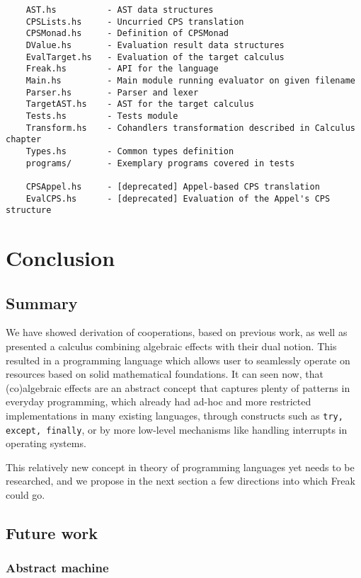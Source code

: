 \documentclass[declaration,shortabstract]{iithesis}
\theoremstyle{definition} \newtheorem{definition}{Definition}[chapter]
\theoremstyle{remark} \newtheorem{remark}[definition]{Observation}
\theoremstyle{plain} \newtheorem{theorem}[definition]{Theorem}
\theoremstyle{plain} \newtheorem{lemma}[definition]{Lemma}
\begin{document}
\begin{verbatim}
    AST.hs          - AST data structures
    CPSLists.hs     - Uncurried CPS translation
    CPSMonad.hs     - Definition of CPSMonad
    DValue.hs       - Evaluation result data structures
    EvalTarget.hs   - Evaluation of the target calculus
    Freak.hs        - API for the language
    Main.hs         - Main module running evaluator on given filename
    Parser.hs       - Parser and lexer
    TargetAST.hs    - AST for the target calculus
    Tests.hs        - Tests module
    Transform.hs    - Cohandlers transformation described in Calculus chapter
    Types.hs        - Common types definition
    programs/       - Exemplary programs covered in tests

    CPSAppel.hs     - [deprecated] Appel-based CPS translation
    EvalCPS.hs      - [deprecated] Evaluation of the Appel's CPS structure
\end{verbatim}

\chapter{Conclusion}\label{chapter:conclusion}
\section{Summary}

    We have showed derivation of cooperations, based on previous work, as well
    as presented a calculus combining algebraic effects with their dual notion.
    This resulted in a programming language which allows user to seamlessly
    operate on resources based on solid mathematical foundations. It can seen now,
    that (co)algebraic effects are an abstract concept that captures plenty of
    patterns in everyday programming, which already had ad-hoc and more
    restricted implementations in many existing languages, through constructs
    such as \verb!try, except, finally!, or by more low-level mechanisms
    like handling interrupts in operating systems.

    This relatively new concept in theory of programming languages yet needs to
    be researched, and we propose in the next section a few directions into
    which Freak could go.

\section{Future work}

    \subsection{Abstract machine}
\end{document}
